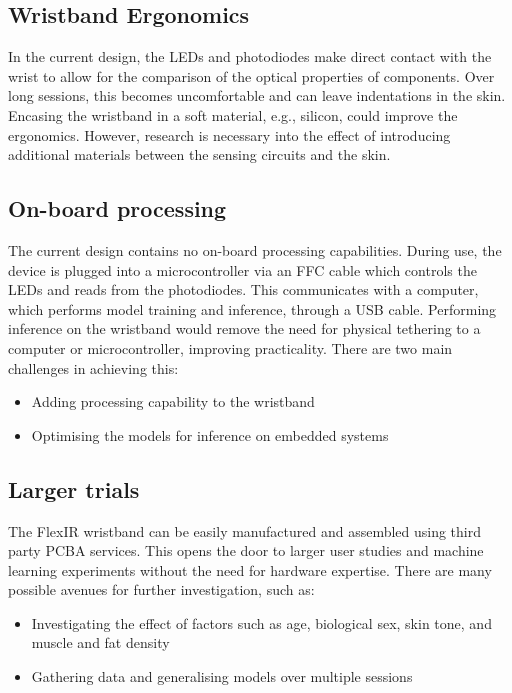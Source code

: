 \documentclass[ oneside,%
                    author={Jack Jarvis},
                    degree={BSc},
                     title={FlexIR: Flexible PCB Wristbands for Infrared Based Gesture Recognition},
                    unit={COMS30045},
                    subtitle={Investigating the Effect of LED Viewing Angle on Gesture Classification in Infrared Sensing Systems}]{dissertation}
\begin{document}
\subsection{Wristband Ergonomics}
In the current design, the LEDs and photodiodes make direct contact with the wrist to allow for the comparison of the optical properties of components. Over long sessions, this becomes uncomfortable and can leave indentations in the skin. Encasing the wristband in a soft material, e.g., silicon, could improve the ergonomics. However, research is necessary into the effect of introducing additional materials between the sensing circuits and the skin.

\subsection{On-board processing}
The current design contains no on-board processing capabilities. During use, the device is plugged into a microcontroller via an FFC cable which controls the LEDs and reads from the photodiodes. This communicates with a computer, which performs model training and inference, through a USB cable. Performing inference on the wristband would remove the need for physical tethering to a computer or microcontroller, improving practicality. There are two main challenges in achieving this:

\begin{itemize}
    \item Adding processing capability to the wristband
    \item Optimising the models for inference on embedded systems
\end{itemize}

\subsection{Larger trials}
The FlexIR wristband can be easily manufactured and assembled using third party PCBA services. This opens the door to larger user studies and machine learning experiments without the need for hardware expertise. There are many possible avenues for further investigation, such as:
\begin{itemize}
    \item Investigating the effect of factors such as age, biological sex, skin tone, and muscle and fat density
    \item Gathering data and generalising models over multiple sessions
\end{itemize}
\end{document}
